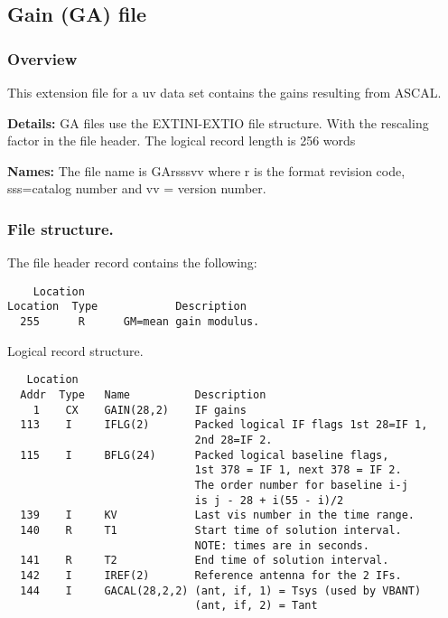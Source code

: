 \subsection{Gain (GA) file}
\subsubsection{Overview}
 
 This extension file for a uv data set contains the
gains resulting from ASCAL.
 
{\bf Details:} GA files use the EXTINI-EXTIO file structure.  With the
rescaling factor in the file header.  The logical record
length is 256 words
 
{\bf Names:} The file name is GArsssvv where r is the format revision
code, sss=catalog number and vv = version number.
 
\subsubsection{ File structure.}

    The file header record contains the following:
 
\begin{verbatim}
    Location
Location  Type            Description
  255      R      GM=mean gain modulus.
\end{verbatim}

   Logical record structure.
 
\begin{verbatim}
   Location
  Addr  Type   Name          Description
    1    CX    GAIN(28,2)    IF gains
  113    I     IFLG(2)       Packed logical IF flags 1st 28=IF 1,
                             2nd 28=IF 2.
  115    I     BFLG(24)      Packed logical baseline flags,
                             1st 378 = IF 1, next 378 = IF 2.
                             The order number for baseline i-j
                             is j - 28 + i(55 - i)/2
  139    I     KV            Last vis number in the time range.
  140    R     T1            Start time of solution interval.
                             NOTE: times are in seconds.
  141    R     T2            End time of solution interval.
  142    I     IREF(2)       Reference antenna for the 2 IFs.
  144    I     GACAL(28,2,2) (ant, if, 1) = Tsys (used by VBANT)
                             (ant, if, 2) = Tant
 
\end{verbatim}
 
